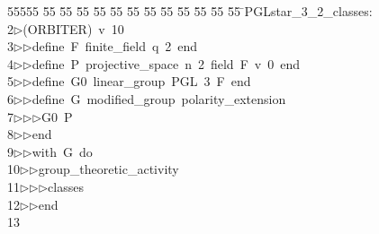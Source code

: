 %
%
\begin{tabbing}
55555 \= 55 \= 55 \= 55 \= 55 \= 55 \= 55 \= 55 \= 55 \= 55 \= 55 \= 55 \= 55 \= \>PGLstar\_3\_2\_classes:\\[0pt]
2\>$\triangleright$\>(ORBITER)\ v\ 10\ \\[0pt]
3\>$\triangleright$\>$\triangleright$\>define\ F\ finite\_field\ q\ 2\ end\ \\[0pt]
4\>$\triangleright$\>$\triangleright$\>define\ P\ projective\_space\ n\ 2\ field\ F\ v\ 0\ end\ \\[0pt]
5\>$\triangleright$\>$\triangleright$\>define\ G0\ linear\_group\ PGL\ 3\ F\ end\ \\[0pt]
6\>$\triangleright$\>$\triangleright$\>define\ G\ modified\_group\ polarity\_extension\ \\[0pt]
7\>$\triangleright$\>$\triangleright$\>$\triangleright$\>G0\ P\ \\[0pt]
8\>$\triangleright$\>$\triangleright$\>end\ \\[0pt]
9\>$\triangleright$\>$\triangleright$\>with\ G\ do\ \\[0pt]
10\>$\triangleright$\>$\triangleright$\>group\_theoretic\_activity\ \\[0pt]
11\>$\triangleright$\>$\triangleright$\>$\triangleright$\>classes\ \\[0pt]
12\>$\triangleright$\>$\triangleright$\>end\\[0pt]
13\>\end{tabbing}

